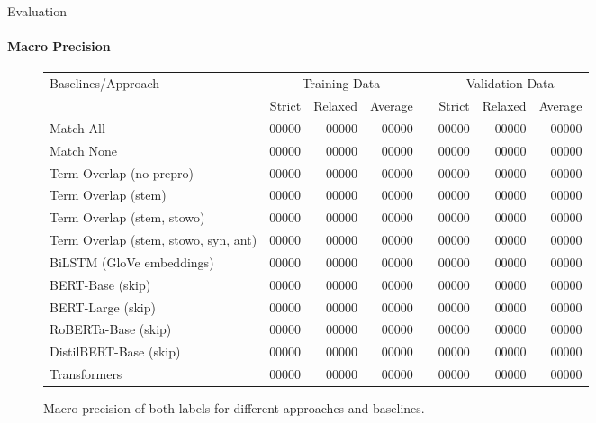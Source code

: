 \documentclass[english,handout]{mlutalk}
\begin{document}
\begin{frame}{Evaluation}
  \framesubtitle{Macro Precision}
  \begin{figure}
    \centering
    \caption{Macro precision of both labels for different approaches and baselines.}
    \tiny
    \begin{tabular}{lrrrlrrr}
      \toprule
      Baselines/Approach & \multicolumn{3}{c}{Training Data} & & \multicolumn{3}{c}{Validation Data}\\ \cline{2-4} \cline{6-8}
        & Strict & Relaxed & Average & & Strict & Relaxed & Average\\
      \midrule
      Match All                           & 00000 & 00000 & 00000 & & 00000 & 00000 & 00000\\
      Match None                          & 00000 & 00000 & 00000 & & 00000 & 00000 & 00000\\
      Term Overlap (no prepro)            & 00000 & 00000 & 00000 & & 00000 & 00000 & 00000\\
      Term Overlap (stem)                 & 00000 & 00000 & 00000 & & 00000 & 00000 & 00000\\
      Term Overlap (stem, stowo)          & 00000 & 00000 & 00000 & & 00000 & 00000 & 00000\\
      Term Overlap (stem, stowo, syn, ant)& 00000 & 00000 & 00000 & & 00000 & 00000 & 00000\\
      \midrule
      BiLSTM (GloVe embeddings)           & 00000 & 00000 & 00000 & & 00000 & 00000 & 00000\\
      BERT-Base (skip)                    & 00000 & 00000 & 00000 & & 00000 & 00000 & 00000\\
      BERT-Large (skip)                   & 00000 & 00000 & 00000 & & 00000 & 00000 & 00000\\
      RoBERTa-Base (skip)                 & 00000 & 00000 & 00000 & & 00000 & 00000 & 00000\\
      DistilBERT-Base (skip)              & 00000 & 00000 & 00000 & & 00000 & 00000 & 00000\\
      Transformers                        & 00000 & 00000 & 00000 & & 00000 & 00000 & 00000\\
      \bottomrule
    \end{tabular}
  \end{figure}
\end{frame}
\end{document}
